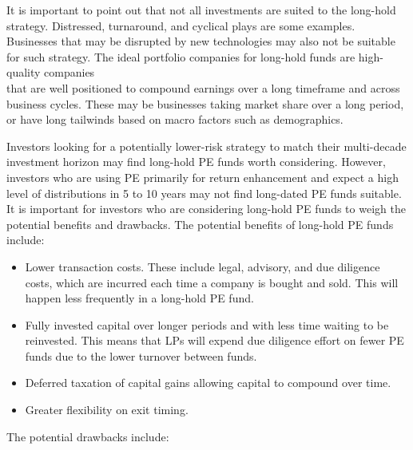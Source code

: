 \documentclass[11pt]{article}
\begin{document}
It is important to point out that not all investments are suited to the long-hold strategy. Distressed, turnaround, and cyclical plays are some examples. Businesses that may be disrupted by new technologies may also not be suitable for such strategy. The ideal portfolio companies for long-hold funds are high-quality companies\\
that are well positioned to compound earnings over a long timeframe and across business cycles. These may be businesses taking market share over a long period, or have long tailwinds based on macro factors such as demographics.

Investors looking for a potentially lower-risk strategy to match their multi-decade investment horizon may find long-hold PE funds worth considering. However, investors who are using PE primarily for return enhancement and expect a high level of distributions in 5 to 10 years may not find long-dated PE funds suitable. It is important for investors who are considering long-hold PE funds to weigh the potential benefits and drawbacks. The potential benefits of long-hold PE funds include:

\begin{itemize}
  \item Lower transaction costs. These include legal, advisory, and due diligence costs, which are incurred each time a company is bought and sold. This will happen less frequently in a long-hold PE fund.
  \item Fully invested capital over longer periods and with less time waiting to be reinvested. This means that LPs will expend due diligence effort on fewer PE funds due to the lower turnover between funds.
  \item Deferred taxation of capital gains allowing capital to compound over time.
  \item Greater flexibility on exit timing.
\end{itemize}

The potential drawbacks include:
\end{document}
